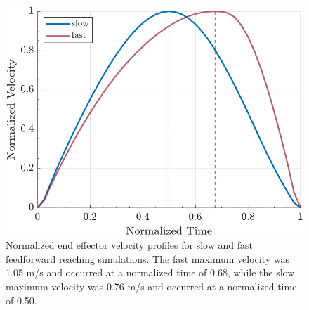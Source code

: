 \documentclass[letterpaper, 10pt, conference]{ieeeconf}
\begin{document}

\begin{figure}[h]
    \centering
    \includegraphics[width=1\linewidth]{images/single_slow_fast.jpg}
    \caption{Normalized end effector velocity profiles for slow and fast feedforward reaching simulations. The fast maximum velocity was 1.05 m/s and occurred at a normalized time of 0.68, while the slow maximum velocity was 0.76 m/s and occurred at a normalized time of 0.50.}
    \label{fig:VelocityFeedforward}
\end{figure}
\end{document}
